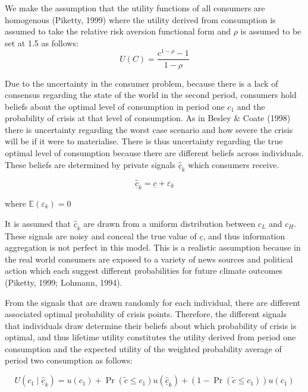 \documentclass[11pt,preprint, authoryear]{elsarticle}
\numberwithin{equation}{section}
\numberwithin{figure}{section}
\numberwithin{table}{section}
\begin{document}
We make the assumption that the utility functions of all consumers are
homogenous (Piketty, 1999) where the utility derived from consumption is
assumed to take the relative risk aversion functional form and \(\rho\)
is assumed to be set at 1.5 as follows: \[
U(C)=\frac{c^{1-\rho}-1}{1-\rho}
\]

Due to the uncertainty in the consumer problem, because there is a lack
of consensus regarding the state of the world in the second period,
consumers hold beliefs about the optimal level of consumption in period
one \(c_1\) and the probability of crisis at that level of consumption.
As in Besley \& Coate (1998) there is uncertainty regarding the worst
case scenario and how severe the crisis will be if it were to
materialise. There is thus uncertainty regarding the true optimal level
of consumption because there are different beliefs across individuals.
These beliefs are determined by private signals
\(\hat{\underline{c}}_k\) which consumers receive.

\[
\hat{\underline{c}}_k=\underline{c}+\varepsilon_k
\]

\begin{center}
where  $\mathbb{E}\left(\varepsilon_k\right)=0$ 
\end{center}

It is assumed that \(\hat{\underline{c}}_k\) are drawn from a uniform
distribution between \(c_L\) and \(c_H\). These signals are noisy and
conceal the true value of \(\underline{c}\), and thus information
aggregation is not perfect in this model. This is a realistic assumption
because in the real world consumers are exposed to a variety of news
sources and political action which each suggest different probabilities
for future climate outcomes (Piketty, 1999; Lohmann, 1994).

From the signals that are drawn randomly for each individual, there are
different associated optimal probability of crisis points. Therefore,
the different signals that individuals draw determine their beliefs
about which probability of crisis is optimal, and thus lifetime utility
constitutes the utility derived from period one consumption and the
expected utility of the weighted probability average of period two
consumption as follows:

\[
U\left(c_1 \mid \hat{\underline{c}}_{k}\right)=u\left(c_1\right)+\operatorname{Pr}\left(\tilde{c} \leq c_1\right) u\left(\hat{\underline{c}}_{k}\right)+\left(1-\operatorname{Pr}\left(\tilde{c} \leq c_1\right)\right) u\left(c_1\right)
\]
\end{document}
